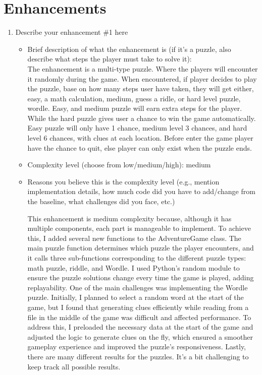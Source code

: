 \documentclass[11pt]{article}
\begin{document}
\section*{Enhancements}
\begin{enumerate}
    \item Describe your enhancement \#1 here
    \begin{itemize}
        \item Brief description of what the enhancement is (if it's a puzzle, also describe what steps the player must take to solve it):
        \\ The enhancement is a multi-type puzzle.
         Where the players will encounter it randomly during the game.
        When encountered, if player decides to play the puzzle, base on how many steps user have taken, they will get either, easy, a math calculation, medium, guess a ridle, or hard level puzzle, wordle. Easy, and medium puzzle will earn extra steps for the player. While the hard puzzle gives user a chance to win the game automatically. Easy puzzle will only have 1 chance, medium level 3 chances, and hard level 6 chances, with clues at each location. Before enter the game player have the chance to quit, else player can only exist when the puzzle ends.
        \item Complexity level (choose from low/medium/high): medium
        \item Reasons you believe this is the complexity level (e.g., mention implementation details, how much code did you have to add/change from the baseline, what challenges did you face, etc.)

          This enhancement is medium complexity because, although it has multiple components, each part is manageable to implement. To achieve this, I added several new functions to the AdventureGame class. The main puzzle function determines which puzzle the player encounters, and it calls three sub-functions corresponding to the different puzzle types: math puzzle, riddle, and Wordle. I used Python's random module to ensure the puzzle solutions change every time the game is played, adding replayability. One of the main challenges was implementing the Wordle puzzle. Initially, I planned to select a random word at the start of the game, but I found that generating clues efficiently while reading from a file in the middle of the game was difficult and affected performance. To address this, I preloaded the necessary data at the start of the game and adjusted the logic to generate clues on the fly, which ensured a smoother gameplay experience and improved the puzzle’s responsiveness. Lastly, there are many different results for the puzzles. It's a bit challenging to keep track all possible results.   \end{itemize}


    \end{enumerate}
\end{document}
